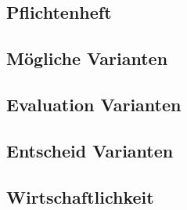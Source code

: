 

\subsection{Pflichtenheft}

\subsection{Mögliche Varianten}

\subsection{Evaluation Varianten}

\subsection{Entscheid Varianten}

\subsection{Wirtschaftlichkeit}
